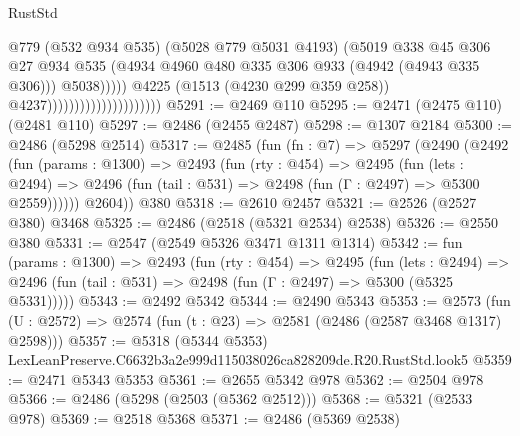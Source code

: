 \begin{lexlean}{RustStd}
\begin{coremodule}
                                                      @779
                                                      (@532 @934 @535)
                                                      (@5028 @779 @5031 @4193)
                                                      (@5019
                                                        @338
                                                        @45
                                                        @306
                                                        @27
                                                        @934
                                                        @535
                                                        (@4934
                                                          @4960
                                                          @480
                                                          @335
                                                          @306
                                                          @933
                                                          (@4942 (@4943 @335 @306)))
                                                        @5038)))))
                                              @4225
                                              (@1513 (@4230 @299 @359 @258))
                                              @4237)))))))))))))))))))))
@5291 := @2469 @110
@5295 := @2471 (@2475 @110) (@2481 @110)
@5297 := @2486 (@2455 @2487)
@5298 := @1307 @2184
@5300 := @2486 (@5298 @2514)
@5317 := @2485
    (fun (fn : @7) =>
    @5297
      (@2490
        (@2492
          (fun (params : @1300) =>
          @2493
            (fun (rty : @454) =>
            @2495
              (fun (lets : @2494) =>
              @2496 (fun (tail : @531) => @2498 (fun (Γ : @2497) => @5300 @2559))))))
        @2604))
    @380
@5318 := @2610 @2457
@5321 := @2526 (@2527 @380) @3468
@5325 := @2486 (@2518 (@5321 @2534) @2538)
@5326 := @2550 @380
@5331 := @2547 (@2549 @5326 @3471 @1311 @1314)
@5342 := fun (params : @1300) =>
  @2493
    (fun (rty : @454) =>
    @2495
      (fun (lets : @2494) =>
      @2496 (fun (tail : @531) => @2498 (fun (Γ : @2497) => @5300 (@5325 @5331)))))
@5343 := @2492 @5342
@5344 := @2490 @5343
@5353 := @2573 (fun (U : @2572) => @2574 (fun (t : @23) => @2581 (@2486 (@2587 @3468 @1317) @2598)))
@5357 := @5318 (@5344 @5353) LexLeanPreserve.C6632b3a2e999d115038026ca828209de.R20.RustStd.look5
@5359 := @2471 @5343 @5353
@5361 := @2655 @5342 @978
@5362 := @2504 @978
@5366 := @2486 (@5298 (@2503 (@5362 @2512)))
@5368 := @5321 (@2533 @978)
@5369 := @2518 @5368
@5371 := @2486 (@5369 @2538)

\end{coremodule}
\end{lexlean}
